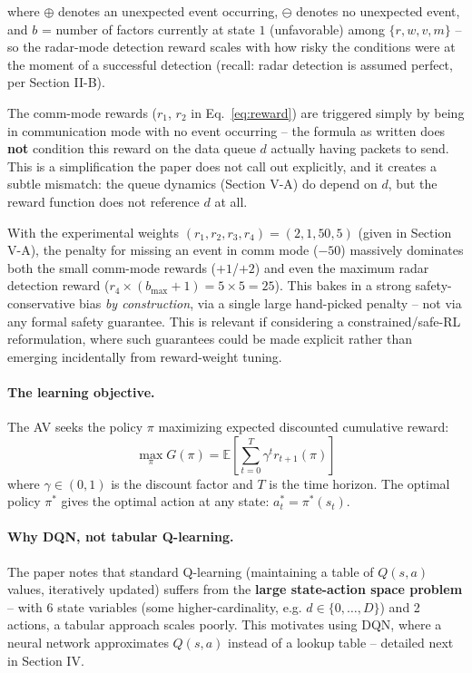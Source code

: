 \documentclass[11pt]{article}
\begin{document}
where $\oplus$ denotes an unexpected event occurring, $\ominus$ denotes no unexpected
event, and $b$ = number of factors currently at state $1$ (unfavorable) among
$\{r,w,v,m\}$ -- so the radar-mode detection reward scales with how risky the
conditions were at the moment of a successful detection (recall: radar detection is
assumed perfect, per Section II-B).

\begin{remark}
The comm-mode rewards ($r_1$, $r_2$ in Eq.~\eqref{eq:reward}) are triggered simply by
being in communication mode with no event occurring -- the formula as written does
\textbf{not} condition this reward on the data queue $d$ actually having packets to
send. This is a simplification the paper does not call out explicitly, and it creates a
subtle mismatch: the queue dynamics (Section V-A) do depend on $d$, but the reward
function does not reference $d$ at all.
\end{remark}

\begin{remark}
With the experimental weights $(r_1,r_2,r_3,r_4) = (2,1,50,5)$ (given in Section V-A),
the penalty for missing an event in comm mode ($-50$) massively dominates both the small
comm-mode rewards ($+1$/$+2$) and even the maximum radar detection reward
($r_4 \times (b_{\max}+1) = 5 \times 5 = 25$). This bakes in a strong
safety-conservative bias \emph{by construction}, via a single large hand-picked penalty
-- not via any formal safety guarantee. This is relevant if considering a
constrained/safe-RL reformulation, where such guarantees could be made explicit rather
than emerging incidentally from reward-weight tuning.
\end{remark}

\paragraph{The learning objective.} The AV seeks the policy $\pi$ maximizing expected
discounted cumulative reward:
\begin{equation}
    \max_{\pi} G(\pi) = \mathbb{E}\left[ \sum_{t=0}^{T} \gamma^t r_{t+1}(\pi) \right]
\end{equation}
where $\gamma \in (0,1)$ is the discount factor and $T$ is the time horizon. The optimal
policy $\pi^*$ gives the optimal action at any state: $a_t^* = \pi^*(s_t)$.

\paragraph{Why DQN, not tabular Q-learning.} The paper notes that standard Q-learning
(maintaining a table of $Q(s,a)$ values, iteratively updated) suffers from the
\textbf{large state-action space problem} -- with 6 state variables (some
higher-cardinality, e.g. $d \in \{0,\dots,D\}$) and 2 actions, a tabular approach scales
poorly. This motivates using DQN, where a neural network approximates $Q(s,a)$ instead
of a lookup table -- detailed next in Section IV.
\end{document}
